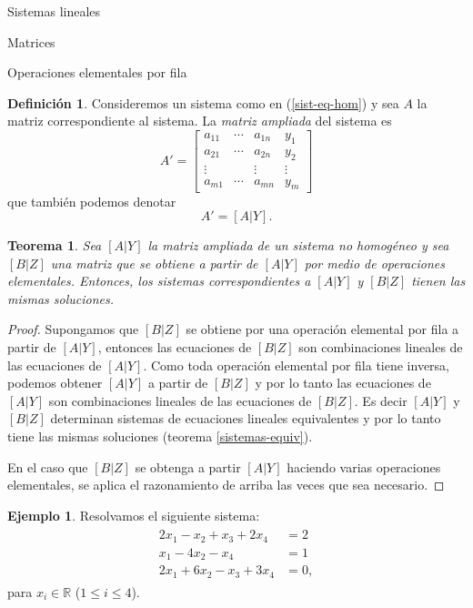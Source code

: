 \documentclass[a4paper,12pt,twoside,spanish,reqno]{amsbook}
\newtheorem{teorema}{Teorema}[section]
\theoremstyle{definition}
\newtheorem{definicion}{Definici\'on}[section]
\newtheorem{ejemplo}{Ejemplo}[section]
\theoremstyle{remark}
\newcommand{\R}{\mathbb R}
\begin{document}
\begin{chapter}{Sistemas lineales}
\begin{section}{Matrices}
\begin{subsection}{Operaciones elementales por fila}
					
				\begin{definicion}
					Consideremos un sistema como en (\ref{sist-eq-hom}) y sea  $A$ la matriz correspondiente al sistema. La \textit{matriz  ampliada} del sistema es 
					\begin{equation}\label{mtrx-ampliada}
					A' = \left[\begin{array}{ccc|c}  
					a_{11} & \cdots & a_{1n} &  y_1 \\
					a_{21} & \cdots & a_{2n} &  y_2 \\
					\vdots &  & \vdots  &  \vdots  \\
					a_{m1} & \cdots & a_{mn} &  y_m 
					\end{array}\right]
					\end{equation}
					que también podemos denotar
					\begin{equation*}
					A' = [A | Y].
					\end{equation*}
				\end{definicion}
				
				
				\begin{teorema}\label{th-equiv-op-elem} Sea $[A | Y]$ la matriz ampliada de un sistema no homogéneo y sea $[B | Z]$ una matriz que se obtiene a partir de $[A | Y]$ por medio de operaciones elementales. Entonces, los sistemas correspondientes a $[A | Y]$ y  $[B | Z]$ tienen las mismas soluciones. 
			\end{teorema}
			\begin{proof}
				 Supongamos que $[B | Z]$ se obtiene por una operación elemental por fila a partir de $[A | Y]$,  entonces las ecuaciones de $[B | Z]$ son combinaciones lineales de las ecuaciones de $[A | Y]$. Como toda operación elemental por fila tiene inversa, podemos obtener $[A | Y]$ a partir de $[B | Z]$ y por lo tanto las ecuaciones de $[A | Y]$ son combinaciones lineales de las ecuaciones de $[B | Z]$. Es decir $[A | Y]$ y $[B | Z]$ determinan sistemas de ecuaciones lineales equivalentes y por lo tanto tiene las mismas soluciones (teorema \ref{sistemas-equiv}).
				 
				 En el caso que $[B | Z]$ se obtenga a partir $[A | Y]$ haciendo varias operaciones elementales,  se aplica el razonamiento de arriba las veces que sea necesario. 
			\end{proof}
				
				\begin{ejemplo}\label{ejemplo2.11}
					Resolvamos el siguiente sistema:
					\begin{align}\label{sist-eq-01}
					\begin{split}
					2x_1 - x_2 + x_3 + 2x_4 &= 2 \\
					x_1 - 4x_2 -x_4 &=1 \\
					2x_1 +6x_2 -x_3 +3x_4 &= 0,  
					\end{split}
					\end{align}
					para  $x_i \in \R$ ($1 \le i \le 4$). 
				

\end{ejemplo}
\end{subsection}
\end{section}
\end{chapter}
\end{document}
